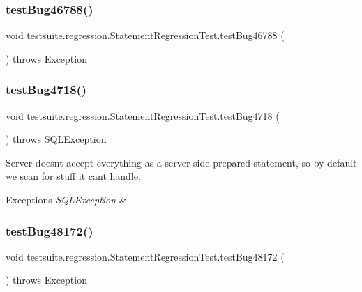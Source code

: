 \subsubsection{\texorpdfstring{test\+Bug46788()}{testBug46788()}}
{\footnotesize\ttfamily void testsuite.\+regression.\+Statement\+Regression\+Test.\+test\+Bug46788 (\begin{DoxyParamCaption}{ }\end{DoxyParamCaption}) throws Exception}

\mbox{\label{classtestsuite_1_1regression_1_1_statement_regression_test_a4a5feeaaf1b8fb177b2f026231e14165}} 
\subsubsection{\texorpdfstring{test\+Bug4718()}{testBug4718()}}
{\footnotesize\ttfamily void testsuite.\+regression.\+Statement\+Regression\+Test.\+test\+Bug4718 (\begin{DoxyParamCaption}{ }\end{DoxyParamCaption}) throws S\+Q\+L\+Exception}

Server doesn\textquotesingle{}t accept everything as a server-\/side prepared statement, so by default we scan for stuff it can\textquotesingle{}t handle.


\begin{DoxyExceptions}{Exceptions}
{\em S\+Q\+L\+Exception} & \\
\hline
\end{DoxyExceptions}
\mbox{\label{classtestsuite_1_1regression_1_1_statement_regression_test_afd2e1dfdf807ebf03427ee8e2dcd52a1}} 
\subsubsection{\texorpdfstring{test\+Bug48172()}{testBug48172()}}
{\footnotesize\ttfamily void testsuite.\+regression.\+Statement\+Regression\+Test.\+test\+Bug48172 (\begin{DoxyParamCaption}{ }\end{DoxyParamCaption}) throws Exception}

